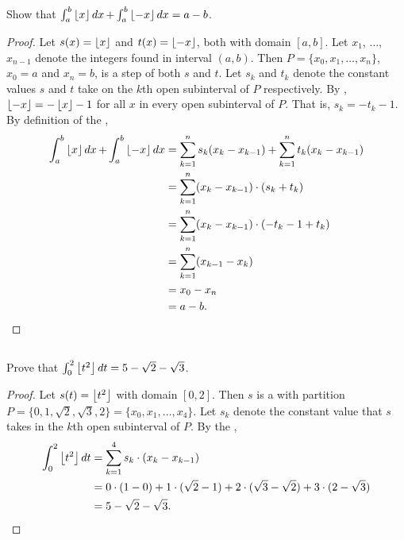 \documentclass{report}
\begin{document}
  Show that
    $\int_a^b \left\lfloor x\right\rfloor \mathop{dx} + \int_a^b \left\lfloor-x\right\rfloor \mathop{dx} = a - b$.

  \begin{proof}
    Let $s(x) = \left\lfloor x\right\rfloor$ and $t(x) = \left\lfloor-x\right\rfloor$, both with domain $[a, b]$.
    Let $x_1$, $\ldots$, $x_{n-1}$ denote the integers found in interval
      $(a, b)$.
    Then $P = \{x_0, x_1, \ldots, x_n\}$, $x_0 = a$ and $x_n = b$, is a step
       of both $s$ and $t$.
    Let $s_k$ and $t_k$ denote the constant values $s$ and $t$ take on the $k$th
      open subinterval of $P$ respectively.
    By , $\left\lfloor-x\right\rfloor = -\left\lfloor x\right\rfloor - 1$ for all
      $x$ in every open subinterval of $P$.
    That is, $s_k = -t_k - 1$.
    By definition of the ,
      \begin{align*}
        \int_a^b \left\lfloor x\right\rfloor \mathop{dx} + \int_a^b \left\lfloor-x\right\rfloor \mathop{dx}
          & = \sum_{k=1}^n s_k (x_k - x_{k-1}) +
              \sum_{k=1}^n t_k (x_k - x_{k-1}) \\
          & = \sum_{k=1}^n (x_k - x_{k-1}) \cdot (s_k + t_k) \\
          & = \sum_{k=1}^n (x_k - x_{k-1}) \cdot (-t_k - 1 + t_k) \\
          & = \sum_{k=1}^n (x_{k-1} - x_k) \\
          & = x_0 - x_n \\
          & = a - b.
      \end{align*}
  \end{proof}

\subsection{}%

\subsubsection{}%

  Prove that $\int_0^2 \left\lfloor t^2\right\rfloor \mathop{dt} = 5 - \sqrt{2} - \sqrt{3}$.

  \begin{proof}
    Let $s(t) = \left\lfloor t^2\right\rfloor$ with domain $[0, 2]$.
    Then $s$ is a  with partition
      $P = \{0, 1, \sqrt{2}, \sqrt{3}, 2\} = \{x_0, x_1, \ldots, x_4\}$.
    Let $s_k$ denote the constant value that $s$ takes in the $k$th open
      subinterval of $P$.
    By the ,
      \begin{align*}
        \int_0^2 \left\lfloor t^2\right\rfloor \mathop{dt}
          & = \sum_{k=1}^4 s_k \cdot (x_k - x_{k-1}) \\
          & = 0 \cdot (1 - 0) + 1 \cdot (\sqrt{2} - 1) +
              2 \cdot (\sqrt{3} - \sqrt{2}) + 3 \cdot (2 - \sqrt{3}) \\
          & = 5 - \sqrt{2} - \sqrt{3}.
      \end{align*}
  \end{proof}
\end{document}
